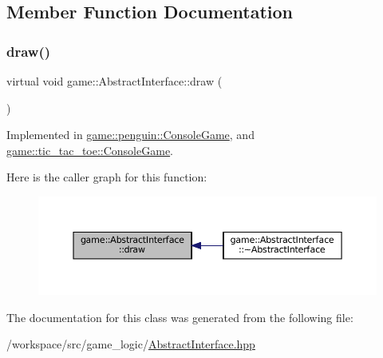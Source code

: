 \subsection{Member Function Documentation}
\mbox{\label{classgame_1_1_abstract_interface_af4330557019768a4be424165e4cf008f}} 
\subsubsection{\texorpdfstring{draw()}{draw()}}
{\footnotesize\ttfamily virtual void game\+::\+Abstract\+Interface\+::draw (\begin{DoxyParamCaption}{ }\end{DoxyParamCaption})\hspace{0.3cm}{\ttfamily [pure virtual]}}



Implemented in \hyperlink{classgame_1_1penguin_1_1_console_game_a71c697742201f71b29327bf8554c2ef0}{game\+::penguin\+::\+Console\+Game}, and \hyperlink{classgame_1_1tic__tac__toe_1_1_console_game_a209ec289b23e0325417d50a31a323b37}{game\+::tic\+\_\+tac\+\_\+toe\+::\+Console\+Game}.

Here is the caller graph for this function\+:
\nopagebreak
\begin{figure}[H]
\begin{center}
\leavevmode
\includegraphics[width=350pt]{classgame_1_1_abstract_interface_af4330557019768a4be424165e4cf008f_icgraph}
\end{center}
\end{figure}


The documentation for this class was generated from the following file\+:\begin{DoxyCompactItemize}
\item 
/workspace/src/game\+\_\+logic/\hyperlink{_abstract_interface_8hpp}{Abstract\+Interface.\+hpp}\end{DoxyCompactItemize}
